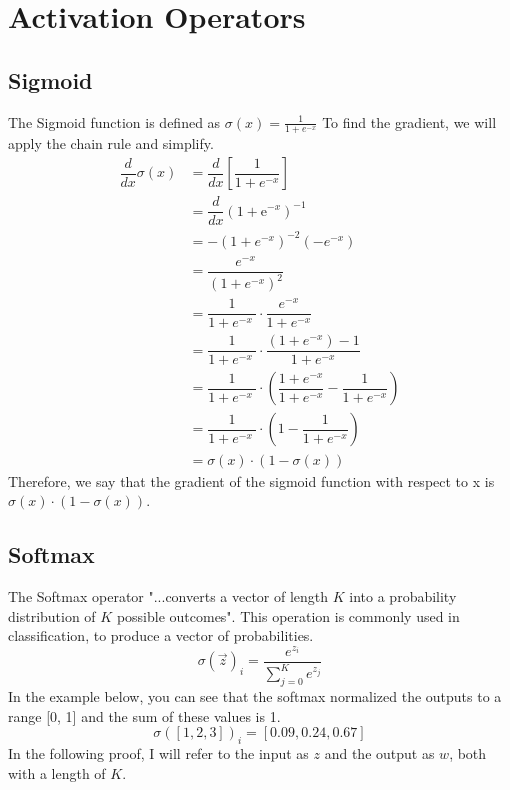 \documentclass{report}
\begin{document}
    \chapter{Activation Operators}

        \section{Sigmoid}
            The Sigmoid function is defined as $\sigma(x) = \frac{1}{1+e^{-x}}$ To find the gradient, we will apply the chain rule and simplify.
            \begin{align}
                \dfrac{d}{dx} \sigma(x) &= \dfrac{d}{dx} \left[ \dfrac{1}{1 + e^{-x}} \right]\\
                &= \dfrac{d}{dx} \left( 1 + \mathrm{e}^{-x} \right)^{-1} \\
                &= -(1 + e^{-x})^{-2}(-e^{-x}) \\
                &= \dfrac{e^{-x}}{\left(1 + e^{-x}\right)^2} \\
                &= \dfrac{1}{1 + e^{-x}\ } \cdot \dfrac{e^{-x}}{1 + e^{-x}}  \\
                &= \dfrac{1}{1 + e^{-x}\ } \cdot \dfrac{(1 + e^{-x}) - 1}{1 + e^{-x}}  \\
                &= \dfrac{1}{1 + e^{-x}\ } \cdot \left( \dfrac{1 + e^{-x}}{1 + e^{-x}} - \dfrac{1}{1 + e^{-x}} \right) \\
                &= \dfrac{1}{1 + e^{-x}\ } \cdot \left( 1 - \dfrac{1}{1 + e^{-x}} \right) \\
                &= \sigma(x) \cdot (1 - \sigma(x))
            \end{align}
            Therefore, we say that the gradient of the sigmoid function with respect to x is $\sigma(x) \cdot (1-\sigma(x))$.

        \section{Softmax}
            The Softmax operator "...converts a vector of length $K$ into a probability distribution of $K$ possible outcomes".\cite{wiki:Softmax_function} This operation
            is commonly used in classification, to produce a vector of probabilities. 
            $$\sigma(\overrightarrow{z})_i = \frac{e^{z_i}}{\sum_{j=0}^{K}e^{z_j}}$$
            In the example below, you can see that the softmax normalized the outputs to a range [0, 1] and the sum of these values is 1.  
            $$\sigma([1, 2, 3])_i = [0.09, 0.24, 0.67]$$
            In the following proof, I will refer to the input as $z$ and the output as $w$, both with a length of $K$. 
\end{document}
